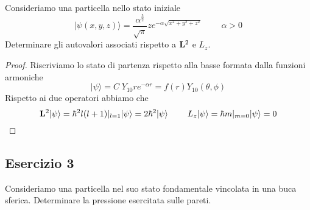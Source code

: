 Consideriamo una particella nello stato iniziale 
\begin{equation*}
	|\psi(x,y,z) \rangle = \frac{\alpha^{\frac{5}{2}}}{\sqrt{\pi}} z e^{-\alpha \sqrt{x^2 + y^2 + z^2}} \quad\; \quad  \alpha > 0 
\end{equation*}
Determinare gli autovalori associati rispetto a $\bold{L}^2$ e $L_z$.
\begin{proof}
Riscriviamo lo stato di partenza rispetto alla basse formata dalla funzioni armoniche 
\begin{equation*}
	|\psi \rangle = C \; Y_{10}re^{-\alpha r} = f(r)Y_{10}(\theta,\phi)
\end{equation*}	
Rispetto ai due operatori abbiamo che 
\begin{equation*}
	\bold{L}^2|\psi \rangle = \hbar^2l(l+1)|_{l=1}|\psi \rangle  = 2 \hbar^2|\psi \rangle  \quad \; \quad L_z|\psi \rangle = \hbar m|_{m=0}|\psi \rangle = 0 
\end{equation*}

\end{proof}

\subsection{Esercizio 3}

Consideriamo una particella nel suo stato fondamentale vincolata in una buca sferica. Determinare la pressione esercitata sulle pareti.
\newpage

